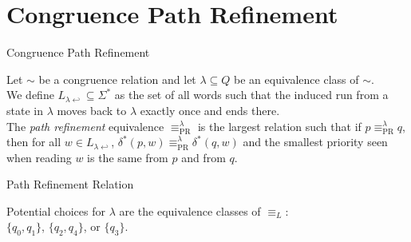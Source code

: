 \section{Congruence Path Refinement}
\begin{frame}{Congruence Path Refinement}
	\begin{defn}
	Let $\sim$ be a congruence relation and let $\lambda \subseteq Q$ be an equivalence class of $\sim$. \\
	We define $L_{\lambda \hookleftarrow} \subseteq \Sigma^*$ as the set of all words such that the induced run from a state in $\lambda$ moves back to $\lambda$ exactly once and ends there. \\ 
	The \emph{path refinement} equivalence $\equiv_\text{PR}^\lambda$ is the largest relation such that if $p \equiv_\text{PR}^\lambda q$, then for all $w \in L_{\lambda \hookleftarrow}$, $\delta^*(p, w) \equiv_\text{PR}^\lambda \delta^*(q, w)$ and the smallest priority seen when reading $w$ is the same from $p$ and from $q$.
	\end{defn}
\end{frame}



\begin{frame}{Path Refinement Relation}
\begin{figure}
\centering
{}
\end{figure}

Potential choices for $\lambda$ are the equivalence classes of $\equiv_L$: \\ 
$\{q_0, q_1\}$, $\{q_2, q_4\}$, or $\{q_3\}$.
\end{frame}



